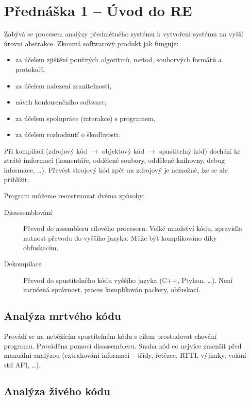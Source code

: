 \section{Přednáška 1 -- Úvod do RE}

Zabývá se procesem analýzy předmětného systému k vytvoření systému na vyšší úrovni abstrakce.
Zkoumá softwarový produkt jak funguje:

\begin{itemize}
    \item za účelem zjištění použitých algoritmů, metod, souborvých formátů a protokolů,
    \item za účelem nalezení zranitelnosti,
    \item návrh konkurenčního software,
    \item za účelem spolupráce (interakce) s programem,
    \item za účelem rozhodnutí o škodlivosti.
\end{itemize}

Při kompilaci (zdrojový kód \(\rightarrow\) objektový kód $\rightarrow$ spustitelný kód) dochází ke ztrátě imformací (komentáře, oddělené soubory, oddělené knihovny, debug informace, \dots).
Převést strojový kód zpět na zdrojový je nemožné, lze se ale přiblížit.

Program můžeme reonstruovat dvěma způsoby:

\begin{description}
    \item[Disassemblování] Převod do assembleru cílového procesoru. Velké množství kódu, zpravidla nutnost převodu do vyššího jazyka. Může být komplikováno díky obfuskacím.
    \item[Dekompilace] Převod do spustitelného kódu vyššího jazyka (C++, Ptyhon, \dots). Není zaručená správnost, proces komplikován packery, obfuskací. 
\end{description}

\subsection*{Analýza mrtvého kódu}

Provádí se na neběžícím spustitelném kódu s cílem prostudovat chování programu.
Prováděna pomocí disassembleru.
Snaha kód co nejvíce zmenšit před manuální analýzou (extrahování informací -- třídy, řetězce, RTTI, výjimky, volání std API, \dots).

\subsection*{Analýza živého kódu}

